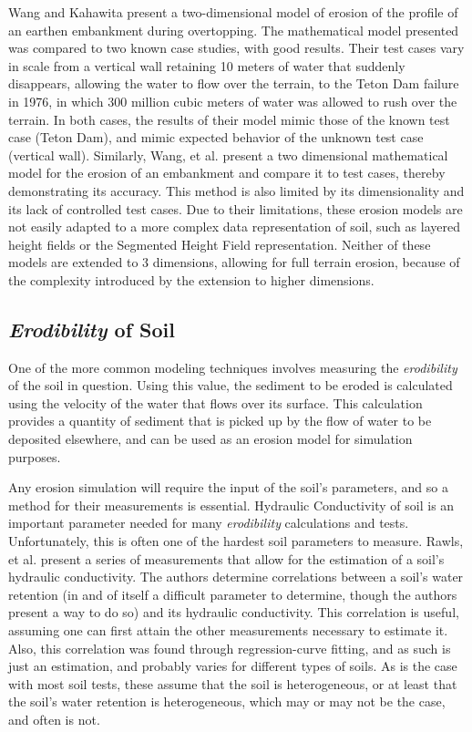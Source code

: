 Wang and Kahawita \cite{Wang-ModelingTheHydraulics} present a two-dimensional model of erosion of the profile of an earthen embankment during overtopping. The mathematical model presented was compared to two known case studies, with good results. Their test cases vary in scale from a vertical wall retaining 10 meters of water that suddenly disappears, allowing the water to flow over the terrain, to the Teton Dam failure in 1976, in which 300 million cubic meters of water was allowed to rush over the terrain. In both cases, the results of their model mimic those of the known test case (Teton Dam), and mimic expected behavior of the unknown test case (vertical wall). Similarly, Wang, et al. \cite{Wang-EmbankmentOvertopping} present a two dimensional mathematical model for the erosion of an embankment and compare it to test cases, thereby demonstrating its accuracy. This method is also limited by its dimensionality and its lack of controlled test cases. Due to their limitations, these erosion models are not easily adapted to a more complex data representation of soil, such as layered height fields or the Segmented Height Field representation. Neither of these models are extended to 3 dimensions, allowing for full terrain erosion, because of the complexity introduced by the extension to higher dimensions. 

\subsection{\emph{Erodibility} of Soil}
\label{section:SoilErodibility}

One of the more common modeling techniques involves measuring the \emph{erodibility} of the soil in question. Using this value, the sediment to be eroded is calculated using the velocity of the water that flows over its surface. This calculation provides a quantity of sediment that is picked up by the flow of water to be deposited elsewhere, and can be used as an erosion model for simulation purposes.

Any erosion simulation will require the input of the soil's parameters, and so a method for their measurements is essential. Hydraulic Conductivity of soil is an important parameter needed for many \emph{erodibility} calculations and tests. Unfortunately, this is often one of the hardest soil parameters to measure. Rawls, et al. \cite{Rawls-EstimatingHydraulics} present a series of measurements that allow for the estimation of a soil's hydraulic conductivity. The authors determine correlations between a soil's water retention (in and of itself a difficult parameter to determine, though the authors present a way to do so) and its hydraulic conductivity. This correlation is useful, assuming one can first attain the other measurements necessary to estimate it. Also, this correlation was found through regression-curve fitting, and as such is just an estimation, and probably varies for different types of soils. As is the case with most soil tests, these assume that the soil is heterogeneous, or at least that the soil's water retention is heterogeneous, which may or may not be the case, and often is not.

